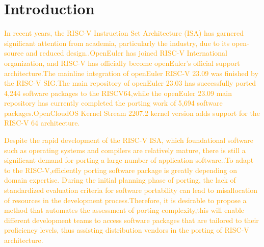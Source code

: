 \documentclass[sigconf,screen,review,anonymous]{acmart}
\begin{document}





\maketitle

\section{Introduction}
\textcolor{orange}{In recent years, the RISC-V Instruction Set Architecture (ISA) has garnered significant attention from academia, particularly the industry, due to its open-source and reduced design.\citep{2014The}.OpenEuler has joined RISC-V International organization, and RISC-V has officially become openEuler's official support architecture.The mainline integration of openEuler RISC-V 23.09 was finished by the RISC-V SIG.The main repository of openEuler 23.03 has successfully ported 4,244 software packages to the RISCV64,while the openEuler 23.09 main repository has currently completed the porting work of 5,694 software packages\citep{osti_1560132}.OpenCloudOS Kernel Stream 2207.2 kernel version adds support for the RISC-V 64 architecture\citep{osti_1560133}.}

\textcolor{orange}{Despite the rapid development of the RISC-V ISA, which foundational software such as operating systems and compilers are relatively mature, there is still a significant demand for porting a large number of application software.\citep{2019Notary}.To adapt to the RISC-V,efficiently porting software package is greatly depending on domain expertise. During the initial planning phase of porting, the lack of standardized evaluation criteria for software portability can lead to misallocation of resources in the development process.Therefore, it is desirable to propose a method that automates the assessment of porting complexity,this will enable different development teams to access software packages that are tailored to their proficiency levels, thus assisting distribution vendors in the porting of RISC-V architecture.}
\end{document}
